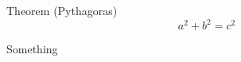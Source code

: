 \documentclass{article}
\begin{document}
\begin{beamerlikethm}{Theorem (Pythagoras)}
\[ a^2 + b^2 = c^2 \]
\end{beamerlikethm}

\lipsum[1-4]

\begin{beamerlikethm}{Something}
\lipsum[5]
\end{beamerlikethm}
\end{document}
